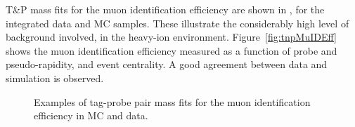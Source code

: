  T\&P mass fits for the muon identification efficiency are shown in , for the integrated data and MC samples. 
These illustrate the considerably high level of background involved, in the heavy-ion environment. 
%
Figure~\ref{fig:tnpMuIDEff} shows the muon identification efficiency measured as a function of probe \pt and pseudo-rapidity, and event centrality. 
A good agreement between data and simulation is observed. 

\begin{figure}[hp]
  \begin{center}
    \hspace{1em}
    \caption{Examples of tag-probe pair mass fits for the muon identification efficiency in MC and data.}
    \label{fig:tnpMuIDFit}
  \end{center}
\end{figure}

